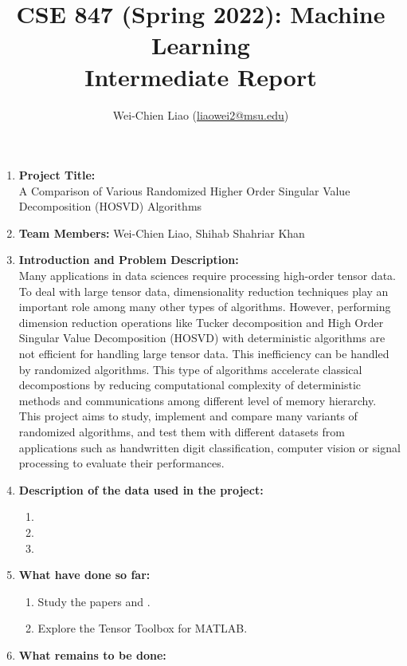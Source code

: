 \documentclass[12pt,a4paper]{article}
\title{\textbf{\large{CSE 847 (Spring 2022): Machine Learning\\ Intermediate Report}}}
\author{Wei-Chien Liao (\href{mailto:liaowei2@msu.edu}{liaowei2@msu.edu})}
\date{}
\begin{document}

\maketitle
\begin{enumerate}
    \item \textbf{Project Title:}\\
    A Comparison of Various Randomized Higher Order Singular Value Decomposition (HOSVD) Algorithms
    \item \textbf{Team Members:} Wei-Chien Liao, Shihab Shahriar Khan
    \item \textbf{Introduction and Problem Description:}\\
    Many applications in data sciences require processing high-order tensor data. To deal
    with large tensor data, dimensionality reduction techniques play an important role among many other types of algorithms. However,
    performing dimension reduction operations like Tucker decomposition and High Order Singular Value Decomposition (HOSVD)
    with deterministic algorithms are not efficient for handling large tensor data. This inefficiency can be
    handled by randomized algorithms. This type of algorithms accelerate classical decompostions by reducing computational complexity
    of deterministic methods and communications among different level of memory hierarchy. This project aims to study, implement and compare
    many variants of randomized algorithms, and test them with different datasets from applications such as handwritten digit classification, computer vision or signal processing 
    to evaluate their performances.
    \item \textbf{Description of the data used in the project:}
    \begin{enumerate}
        \item 
        \item 
        \item 
    \end{enumerate}
    \item \textbf{What have done so far:}
    \begin{enumerate}
        \item Study the papers \cite{9350569} and \cite{Kolda2009}.
        \item Explore the Tensor Toolbox for MATLAB.
    \end{enumerate}
    \item \textbf{What remains to be done:}
    \begin{enumerate}

\end{enumerate}
\end{enumerate}
\end{document}
